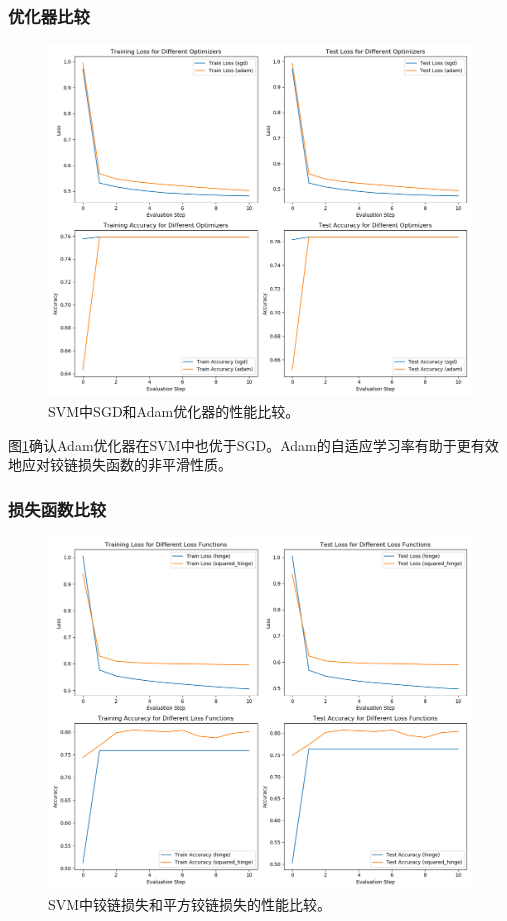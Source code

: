 \documentclass[journal, a4paper]{IEEEtran}
\begin{document}
\begin{CJK}{UTF8}{gbsn}
\subsubsection{优化器比较}
\begin{figure}[htbp]
\centering
\includegraphics[width=\linewidth]{svm_optimizers.png}
\caption{SVM中SGD和Adam优化器的性能比较。}
\label{fig:svm_opt}
\end{figure}

图\ref{fig:svm_opt}确认Adam优化器在SVM中也优于SGD。Adam的自适应学习率有助于更有效地应对铰链损失函数的非平滑性质。

\subsubsection{损失函数比较}
\begin{figure}[htbp]
\centering
\includegraphics[width=\linewidth]{svm_loss_functions.png}
\caption{SVM中铰链损失和平方铰链损失的性能比较。}
\label{fig:svm_loss}
\end{figure}


\end{CJK}
\end{document}
